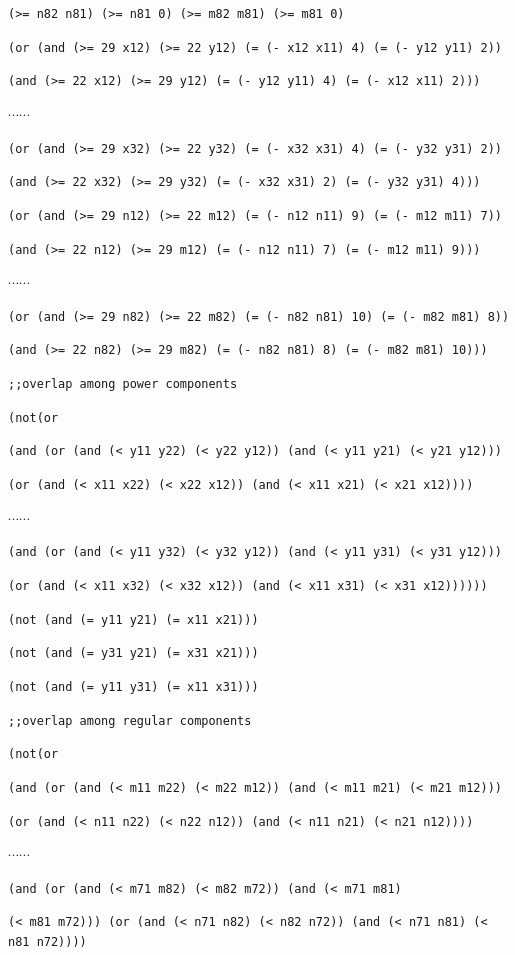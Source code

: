\documentclass[11pt]{article}
\begin{document}
{{{\tt (>= n82 n81) (>= n81 0) (>= m82 m81) (>= m81 0)}

{\tt (or (and (>= 29 x12) (>= 22 y12) (= (- x12 x11) 4) (= (- y12 y11) 2))}

{\tt (and (>= 22 x12) (>= 29 y12) (= (- y12 y11) 4) (= (- x12 x11) 2)))}

$\cdots \cdots$

{\tt (or (and (>= 29 x32) (>= 22 y32) (= (- x32 x31) 4) (= (- y32 y31) 2))}

{\tt (and (>= 22 x32) (>= 29 y32) (= (- x32 x31) 2) (= (- y32 y31) 4)))}

{\tt (or (and (>= 29 n12) (>= 22 m12) (= (- n12 n11) 9) (= (- m12 m11) 7))}

{\tt (and (>= 22 n12) (>= 29 m12) (= (- n12 n11) 7) (= (- m12 m11) 9)))}

$\cdots \cdots$

{\tt (or (and (>= 29 n82) (>= 22 m82) (= (- n82 n81) 10) (= (- m82 m81) 8))}

{\tt (and (>= 22 n82) (>= 29 m82) (= (- n82 n81) 8) (= (- m82 m81) 10)))}

{\tt ;;overlap among power components}

{\tt (not(or}

{\tt (and (or (and (< y11 y22) (< y22 y12)) (and (< y11 y21) (< y21 y12)))}

{\tt (or (and (< x11 x22) (< x22 x12)) (and (< x11 x21) (< x21 x12))))}

$\cdots \cdots$

{\tt (and (or (and (< y11 y32) (< y32 y12)) (and (< y11 y31) (< y31 y12)))}

{\tt (or (and (< x11 x32) (< x32 x12)) (and (< x11 x31) (< x31 x12))))))}

{\tt (not (and (= y11 y21) (= x11 x21)))}

{\tt (not (and (= y31 y21) (= x31 x21)))}

{\tt (not (and (= y11 y31) (= x11 x31)))}

{\tt ;;overlap among regular components}

{\tt (not(or}

{\tt (and (or (and (< m11 m22) (< m22 m12)) (and (< m11 m21) (< m21 m12)))}

{\tt (or (and (< n11 n22) (< n22 n12)) (and (< n11 n21) (< n21 n12))))}

$\cdots \cdots$

{\tt (and (or (and (< m71 m82) (< m82 m72)) (and (< m71 m81)}

{\tt (< m81 m72))) (or (and (< n71 n82) (< n82 n72)) (and (< n71 n81) (< n81 n72))))}

}}
\end{document}
